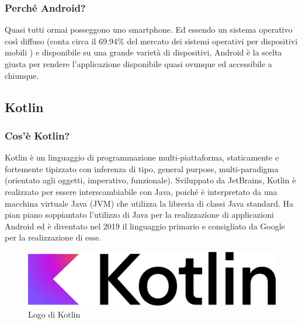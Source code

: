             \subsubsection{Perché Android?}
                Quasi tutti ormai posseggono uno smartphone. Ed essendo un sistema operativo così diffuso (conta circa il 69.94\% del mercato dei sistemi operativi per dispositivi mobili \cite{Statcounter1}) e disponibile su una grande varietà di dispositivi, Android è la scelta giusta per rendere l'applicazione disponibile quasi ovunque ed accessibile a chiunque.
                
        \subsection{Kotlin}
            \subsubsection{Cos'è Kotlin? \cite{Wikipedia2}}
                Kotlin è un linguaggio di programmazione multi-piattaforma, staticamente e fortemente tipizzato con inferenza di tipo, general purpose, multi-paradigma (orientato agli oggetti, imperativo, funzionale). Sviluppato da JetBrains, Kotlin è realizzato per essere interscambiabile con Java, poiché è interpretato da una macchina virtuale Java (JVM) che utilizza la libreria di classi Java standard. Ha pian piano soppiantato l'utilizzo di Java per la realizzazione di applicazioni Android ed è diventato nel 2019 il linguaggio primario e consigliato da Google per la realizzazione di esse.
            \begin{figure}[htbp!]
                \centering
                \includegraphics[width=0.5\linewidth]{Immagini/System Design/Kotlin.png}
                \caption{Logo di Kotlin}
            \end{figure}

